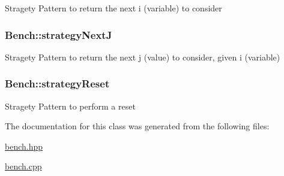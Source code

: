 \-Stragety \-Pattern to return the next i (variable) to consider \hypertarget{classBench_a4a1797a7ffaa0ce346274ac63f2379b3}{
\subsubsection[{strategy\-Next\-J}]{ {\bf \-Bench\-::strategy\-Next\-J}}}\label{classBench_a4a1797a7ffaa0ce346274ac63f2379b3}
\-Stragety \-Pattern to return the next j (value) to consider, given i (variable) \hypertarget{classBench_a88dbf079cc6c2392132efc8038b88443}{
\subsubsection[{strategy\-Reset}]{ {\bf \-Bench\-::strategy\-Reset}}}\label{classBench_a88dbf079cc6c2392132efc8038b88443}
\-Stragety \-Pattern to perform a reset 

\-The documentation for this class was generated from the following files\-:\begin{DoxyCompactItemize}
\item 
\hyperlink{bench_8hpp}{bench.\-hpp}\item 
\hyperlink{bench_8cpp}{bench.\-cpp}\end{DoxyCompactItemize}
